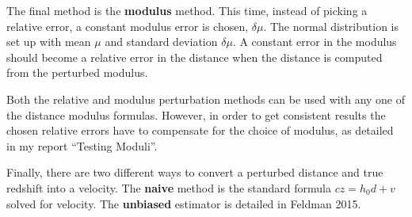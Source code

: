 \documentclass[usenatbib]{mn2e}
\begin{document}
The final method is the \textbf{modulus} method. This time, instead of picking a relative error, a constant modulus error is chosen, $\delta\mu$. The normal distribution is set up with mean $\mu$ and standard deviation $\delta \mu$. A constant error in the modulus should become a relative error in the distance when the distance is computed from the perturbed modulus.

Both the relative and modulus perturbation methods can be used with any one of the distance modulus formulas. However, in order to get consistent results the chosen relative errors have to compensate for the choice of modulus, as detailed in my report ``Testing Moduli''.

Finally, there are two different ways to convert a perturbed distance and true redshift into a velocity. The \textbf{naive} method is the standard formula $cz = h_0 d + v$ solved for velocity. The \textbf{unbiased} estimator is detailed in Feldman 2015.
\end{document}
